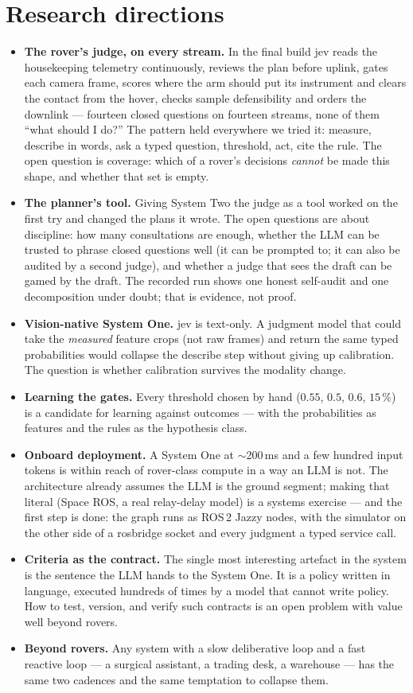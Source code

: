 \documentclass[11pt]{article}
\begin{document}
\section{Research directions}
\begin{itemize}
\item \textbf{The rover's judge, on every stream.} In the final build jev reads the housekeeping telemetry continuously, reviews the plan before uplink, gates each camera frame, scores where the arm should put its instrument and clears the contact from the hover, checks sample defensibility and orders the downlink --- fourteen closed questions on fourteen streams, none of them ``what should I do?'' The pattern held everywhere we tried it: measure, describe in words, ask a typed question, threshold, act, cite the rule. The open question is coverage: which of a rover's decisions \emph{cannot} be made this shape, and whether that set is empty.
\item \textbf{The planner's tool.} Giving System Two the judge as a tool worked on the first try and changed the plans it wrote. The open questions are about discipline: how many consultations are enough, whether the LLM can be trusted to phrase closed questions well (it can be prompted to; it can also be audited by a second judge), and whether a judge that sees the draft can be gamed by the draft. The recorded run shows one honest self-audit and one decomposition under doubt; that is evidence, not proof.
\item \textbf{Vision-native System One.} jev is text-only. A judgment model that could take the \emph{measured} feature crops (not raw frames) and return the same typed probabilities would collapse the describe step without giving up calibration. The question is whether calibration survives the modality change.
\item \textbf{Learning the gates.} Every threshold chosen by hand ($0.55$, $0.5$, $0.6$, $15\,\%$) is a candidate for learning against outcomes --- with the probabilities as features and the rules as the hypothesis class.
\item \textbf{Onboard deployment.} A System One at $\sim$200\,ms and a few hundred input tokens is within reach of rover-class compute in a way an LLM is not. The architecture already assumes the LLM is the ground segment; making that literal (Space ROS, a real relay-delay model) is a systems exercise --- and the first step is done: the graph runs as ROS\,2 Jazzy nodes, with the simulator on the other side of a rosbridge socket and every judgment a typed service call.
\item \textbf{Criteria as the contract.} The single most interesting artefact in the system is the sentence the LLM hands to the System One. It is a policy written in language, executed hundreds of times by a model that cannot write policy. How to test, version, and verify such contracts is an open problem with value well beyond rovers.
\item \textbf{Beyond rovers.} Any system with a slow deliberative loop and a fast reactive loop --- a surgical assistant, a trading desk, a warehouse --- has the same two cadences and the same temptation to collapse them.
\end{itemize}
\end{document}
